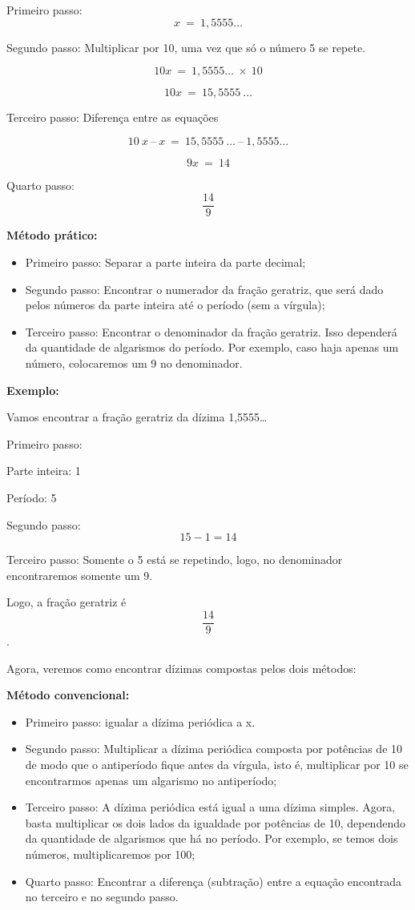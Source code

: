 Primeiro passo: \[x\  = \ 1,5555\ldots\]

Segundo passo: Multiplicar por 10, uma vez que só o número 5 se repete.

\[10x\  = \ 1,5555\ldots\  \times \ 10\]

\[10x\  = \ 15,5555\ \ldots\]

Terceiro passo: Diferença entre as equações

\[10\ x\ –\ x\  = \ 15,5555\ \ldots\ –\ 1,5555\ldots\]

\[9x\  = \ 14\]

Quarto passo: \[\frac{14}{9}\]

\textbf{Método prático:}

\begin{itemize}
\item
  Primeiro passo: Separar a parte inteira da parte decimal;
\item
  Segundo passo: Encontrar o numerador da fração geratriz, que será dado
  pelos números da parte inteira até o período (sem a vírgula);
\item
  Terceiro passo: Encontrar o denominador da fração geratriz. Isso
  dependerá da quantidade de algarismos do período. Por exemplo, caso
  haja apenas um número, colocaremos um 9 no denominador.
\end{itemize}

\textbf{Exemplo:}

Vamos encontrar a fração geratriz da dízima 1,5555\ldots{}

Primeiro passo:

Parte inteira: 1

Período: 5

Segundo passo: \[15 - 1 = 14\]

Terceiro passo: Somente o 5 está se repetindo, logo, no denominador
encontraremos somente um 9.

Logo, a fração geratriz é \[\frac{14}{9}\].

Agora, veremos como encontrar dízimas compostas pelos dois métodos:

\textbf{Método convencional:}

\begin{itemize}
\item
  Primeiro passo: igualar a dízima periódica a x.
\item
  Segundo passo: Multiplicar a dízima periódica composta por potências
  de 10 de modo que o antiperíodo fique antes da vírgula, isto é,
  multiplicar por 10 se encontrarmos apenas um algarismo no antiperíodo;
\item
  Terceiro passo: A dízima periódica está igual a uma dízima simples.
  Agora, basta multiplicar os dois lados da igualdade por potências de
  10, dependendo da quantidade de algarismos que há no período. Por
  exemplo, se temos dois números, multiplicaremos por 100;
\item
  Quarto passo: Encontrar a diferença (subtração) entre a equação
  encontrada no terceiro e no segundo passo.
\end{itemize}

